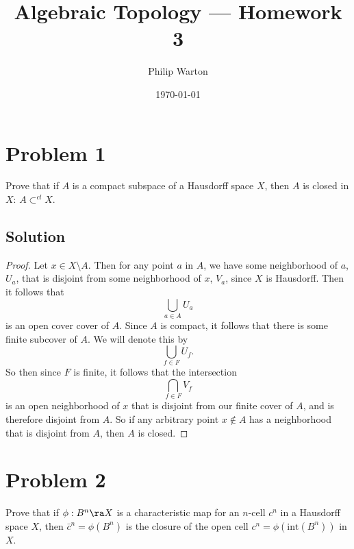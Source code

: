 \documentclass{article}
\theoremstyle{definition}
\begin{document}
\title{Algebraic Topology --- Homework 3}
\author{Philip Warton}
\date{\today}
\maketitle
\section*{Problem 1}
Prove that if $A$ is a compact subspace of a Hausdorff space $X$, 
then $A$ is closed in $X$: $A \subset^{cl} X$.
\\ \hline
\subsection*{Solution}
    \begin{proof}
    Let $x \in X \setminus A$.          
    Then for any point $a$ in $A$, we have some neighborhood of $a$, $U_a$,
    that is disjoint from some neighborhood of $x$, $V_a$, since $X$ is
    Hausdorff.
    Then it follows that 
    \[
    \bigcup_{a\in A}U_a
    \] 
    is an open cover cover of $A$. Since $A$ is compact, it follows that there is some finite subcover of $A$. We will denote this by
    \[
    \bigcup_{f\in F}U_f.
    \] 
    So then since $F$ is finite, it follows that the intersection
    \[
    \bigcap_{f\in F}V_f
    \] 
    is an open neighborhood of $x$ that is disjoint from our finite cover
    of $A$, and is therefore disjoint from $A$.
    So if any arbitrary point $x \notin  A$ has a neighborhood that is 
    disjoint from $A$, then $A$ is closed.
    \end{proof}
\pagebreak
\section*{Problem 2}
Prove that if $\phi: B^n \ra X$ is a characteristic map for an $n$-cell $c^n $ in a Hausdorff space $X$, then $\bar{c}^n = \phi(B^n)$ is the closure of the open cell $c^n = \phi(\mathrm{int}(B^n))$ in $X$.
\\ \hline
\end{document}

